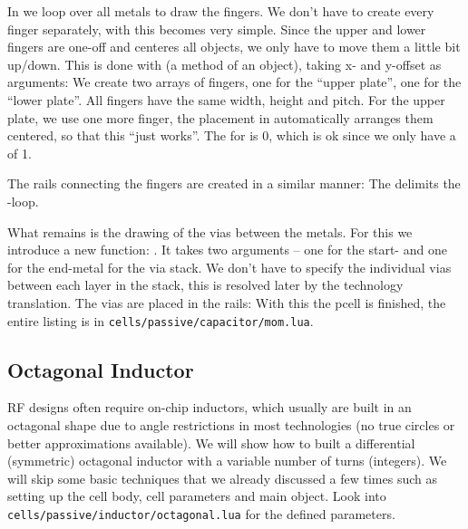 In  we  loop over all metals to draw the fingers. We don't have to create every finger separately, with  this
becomes very simple. Since the upper and lower fingers are one-off and  centeres all objects, we only have to move them a little bit
up/down. This is done with  (a method of an object), taking x- and y-offset as arguments: 
We create two arrays of fingers, one for the \enquote{upper plate}, one for the \enquote{lower plate}. All fingers have the same width, height and pitch. For the
upper plate, we use one more finger, the placement in  automatically arranges them centered, so that this \enquote{just works}.  The
 for  is \num{0}, which is ok since we only have a  of \num{1}. 

The rails connecting the fingers are created in a similar manner:
The  delimits the -loop.

What remains is the drawing of the vias between the metals. For this we introduce a new  function: . It takes two
arguments -- one for the start- and one for the end-metal for the via stack. We don't have to specify the individual vias between each layer in the stack, this
is resolved later by the technology translation. The vias are placed in the rails:
With this the pcell is finished, the entire listing is in \texttt{cells/passive/capacitor/mom.lua}.

\subsection{Octagonal Inductor}
RF designs often require on-chip inductors, which usually are built in an octagonal shape due to angle restrictions in most technologies (no true circles or
better approximations available). We will show how to built a differential (symmetric) octagonal inductor with a variable number of turns (integers). We will
skip some basic techniques that we already discussed a few times such as setting up the cell body, cell parameters and main object. Look into
\texttt{cells/passive/inductor/octagonal.lua} for the defined parameters.

